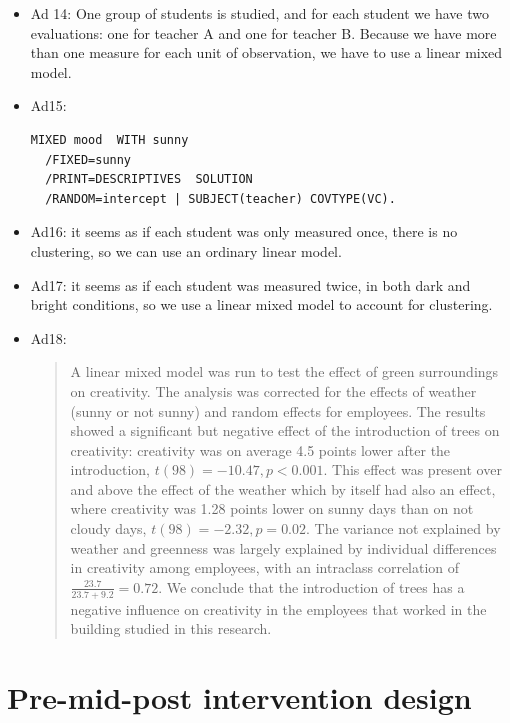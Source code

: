 \documentclass[]{report}\usepackage[]{graphicx}\usepackage[]{color}
\begin{document}
\begin{itemize}
\item Ad 14: One group of students is studied, and for each student we have two evaluations: one for teacher A and one for teacher B. Because we have more than one measure for each unit of observation, we have to use a linear mixed model. 

\item Ad15: 

\begin{verbatim}
MIXED mood  WITH sunny
  /FIXED=sunny
  /PRINT=DESCRIPTIVES  SOLUTION
  /RANDOM=intercept | SUBJECT(teacher) COVTYPE(VC).
\end{verbatim}

\item Ad16: it seems as if each student was only measured once, there is no clustering, so we can use an ordinary linear model.

\item Ad17: it seems as if each student was measured twice, in both dark and bright conditions, so we use a linear mixed model to account for clustering.

\item Ad18: 
\begin{quotation}

A linear mixed model was run to test the effect of green surroundings on creativity. The analysis was corrected for the effects of weather (sunny or not sunny) and random effects for employees. The results showed a significant but negative effect of the introduction of trees on creativity: creativity was on average 4.5 points lower after the introduction, $t(98)=-10.47, p < 0.001$. This effect was present over and above the effect of the weather which by itself had also an effect, where creativity was 1.28 points lower on sunny days than on not cloudy days, $t(98)=-2.32, p=0.02$. The variance not explained by weather and greenness was largely explained by individual differences in creativity among employees, with an intraclass correlation of $\frac{23.7}{23.7+9.2}= 0.72$. We conclude that the introduction of trees has a negative influence on creativity in the employees that worked in the building studied in this research. 

\end{quotation}

\end{itemize}



\section{Pre-mid-post intervention design}
\end{document}

